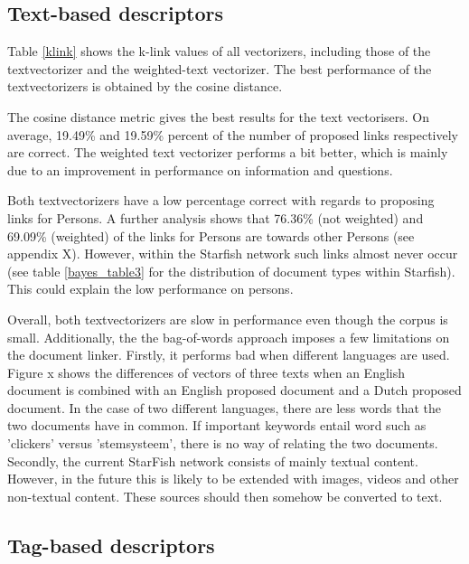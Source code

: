 \subsection{Text-based descriptors}
Table \ref{klink} shows the k-link values of all vectorizers, including those of the textvectorizer and the weighted-text vectorizer. The best performance of the textvectorizers is obtained by the cosine distance. %

The cosine distance metric gives the best results for the text vectorisers. On average, 19.49\% and 19.59\% percent of the number of proposed links respectively are correct. The weighted text vectorizer performs a bit better, which is mainly due to an improvement in performance on information and questions. %

Both textvectorizers have a low percentage correct with regards to proposing links for Persons. A further analysis shows that 76.36\% (not weighted) and 69.09\% (weighted) of the links for Persons are towards other Persons (see appendix X). However, within the Starfish network such links almost never occur (see table \ref{bayes_table3} for the distribution of document types within Starfish). This could explain the low performance on persons. 

Overall, both textvectorizers are slow in performance even though the corpus is small. Additionally, the the bag-of-words approach imposes a few limitations on the document linker. Firstly, it performs bad when different languages are used. Figure x shows the differences of vectors of three texts when an English document is combined with an English proposed document and a Dutch proposed document. In the case of two different languages, there are less words that the two documents have in common. If important keywords entail word such as 'clickers' versus 'stemsysteem', there is no way of relating the two documents. Secondly, the current StarFish network consists of mainly textual content. However, in the future this is likely to be extended with images, videos and other non-textual content. These sources should then somehow be converted to text.

\subsection{Tag-based descriptors}

